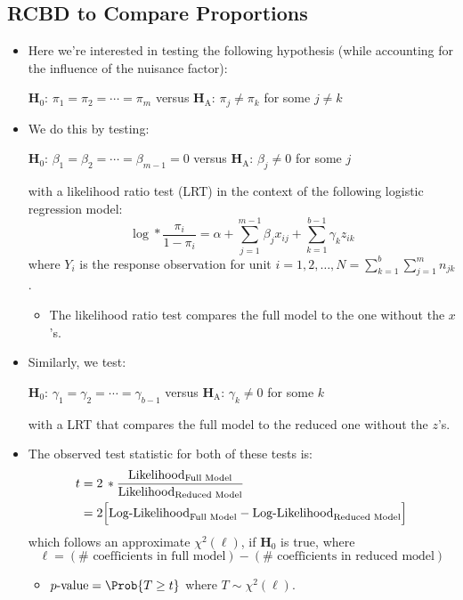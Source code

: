 \subsection{RCBD to Compare Proportions}
\begin{itemize}
      \item Here we're interested in testing the following hypothesis (while accounting for the influence of the
            nuisance factor):
            \begin{tightcenter}
                  $ \mathbf{H}_0 $: $ \pi_1=\pi_2=\cdots=\pi_m $ versus $ \mathbf{H}_\text{A} $: $ \pi_j\ne \pi_k $ for some $ j\ne k $
            \end{tightcenter}
      \item We do this by testing:
            \begin{tightcenter}
                  $ \mathbf{H}_0 $: $ \beta_1=\beta_2=\cdots=\beta_{m-1}=0 $ versus $ \mathbf{H}_\text{A} $: $ \beta_j\ne 0 $ for some $ j$
            \end{tightcenter}
            with a likelihood ratio test (LRT) in the context of the following logistic regression model:
            \[ \log*{\frac{\pi_i}{1-\pi_i}}=\alpha+\sum_{j=1}^{m-1} \beta_j x_{ij}+\sum_{k=1}^{b-1} \gamma_k z_{ik} \]
            where $ Y_i $ is the response observation for unit $ i=1,2,\ldots,N=\sum_{k=1}^{b} \sum_{j=1}^{m} n_{jk} $.
            \begin{itemize}
                  \item The likelihood ratio test compares the full model to the one without the $ x $'s.
            \end{itemize}
      \item Similarly, we test:
            \begin{tightcenter}
                  $ \mathbf{H}_0 $: $ \gamma_1=\gamma_2=\cdots=\gamma_{b-1} $ versus $ \mathbf{H}_\text{A} $: $ \gamma_k\ne 0 $ for some $ k $
            \end{tightcenter}
            with a LRT that compares the full model to the reduced one without the $ z $'s.
      \item The observed test statistic for both of these tests is:
            \begin{align*}
                  t & =2\,\log*{\frac{\text{Likelihood}_{\text{Full Model}}}{\text{Likelihood}_{\text{Reduced Model}}}}    \\
                    & =2\Bigl[\text{Log-Likelihood}_{\text{Full Model}}-\text{Log-Likelihood}_{\text{Reduced Model}}\Bigr]
            \end{align*}
            which follows an approximate $ \chi^2(\ell) $, if $ \mathbf{H}_0 $ is true, where
            \[ \ell=(\#\text{ coefficients in full model})-(\#\text{ coefficients in reduced model}) \]
            \begin{itemize}
                  \item $ p\text{-value}=\Prob{T\ge t} $ where $ T \sim \chi^2(\ell) $.
            \end{itemize}
\end{itemize}
